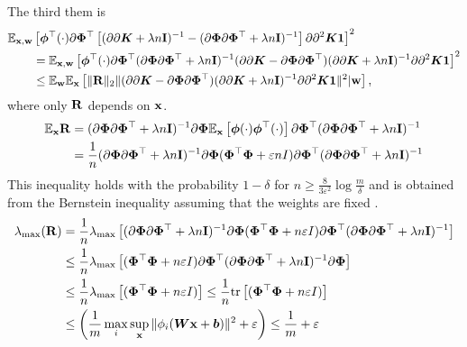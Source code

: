 The third them is
\begin{align*}
    \mathbb{E}_{{\bf x, w}}&\left[{\bm \phi}^{\top}(\cdot)\partial\bm{\Phi}^{\top}\left[(\partial\partial {\bm K} + \lambda n{\bf I})^{-1} - (\partial\bm{\Phi}\partial\bm{\Phi}^{\top} + \lambda n {\bf I})^{-1}\right]\partial\partial^2 {\bm K}{\bf 1}\right]^2 \\
    &= \mathbb{E}_{{\bf x, w}}\left[{\bm \phi}^{\top}(\cdot)\partial\bm{\Phi}^{\top}(\partial\bm{\Phi}\partial\bm{\Phi}^{\top} + \lambda n{\bf I})^{-1}(\partial\partial {\bm K} - \partial\bm{\Phi}\partial\bm{\Phi}^{\top})(\partial\partial {\bm K} + \lambda n {\bf I})^{-1}\partial\partial^2 {\bm K}{\bf 1}\right]^2\\
    &\leq \mathbb{E}_{{\bf w}}\mathbb{E}_{{\bf x}}\left[\|{\bf R}\|_2 \|(\partial\partial {\bm K} - \partial\bm{\Phi}\partial\bm{\Phi}^{\top})(\partial\partial {\bm K} + \lambda n {\bf I})^{-1}\partial\partial^2 {\bm K}{\bf 1}\|^2 | {\bf w}\right],
\end{align*}
where only $\bf R$ depends on ${\bf x}$.
\begin{align*}
    \mathbb{E}_{\bf x}{\bf R}
    &= (\partial\bm{\Phi}\partial\bm{\Phi}^{\top} + \lambda n{\bf I})^{-1}\partial\bm{\Phi}
    \mathbb{E}_{\bf x}\left[{\bm \phi}(\cdot){\bm \phi}^{\top}(\cdot)\right]\partial\bm{\Phi}^{\top}(\partial\bm{\Phi}\partial\bm{\Phi}^{\top} + \lambda n{\bf I})^{-1}\\
    &= \frac{1}{n} (\partial\bm{\Phi}\partial\bm{\Phi}^{\top} + \lambda n{\bf I})^{-1}\partial\bm{\Phi}
    (\bm{\Phi}^{\top}\bm{\Phi} + \varepsilon n I)\partial\bm{\Phi}^{\top}(\partial\bm{\Phi}\partial\bm{\Phi}^{\top} + \lambda n{\bf I})^{-1}
\end{align*}
This inequality holds with the probability $1 - \delta$ for
$n \geq \frac{8}{3\varepsilon^2} \log\frac{m}{\delta}$
and is obtained from the Bernstein inequality assuming that the weights are fixed \cite{Tropp_2015}.
\begin{align*}
    \lambda_{\max}({\bf R})
    &= \frac{1}{n}\lambda_{\max}\left[(\partial\bm{\Phi}\partial\bm{\Phi}^{\top} +
    \lambda n{\bf I})^{-1}\partial\bm{\Phi}
    (\bm{\Phi}^{\top}\bm{\Phi} + n\varepsilon I)\partial\bm{\Phi}^{\top}(\partial\bm{\Phi}
    \partial\bm{\Phi}^{\top} + \lambda n{\bf I})^{-1}\right]\\
    &\leq \frac{1}{n}\lambda_{\max}\left[(\bm{\Phi}^{\top}\bm{\Phi} + n\varepsilon I)
    \partial\bm{\Phi}^{\top}(\partial\bm{\Phi}\partial\bm{\Phi}^{\top} + \lambda n{\bf I})^{-1}\partial\bm{\Phi}
    \right]\\
    &\leq \frac{1}{n}\lambda_{\max}\left[(\bm{\Phi}^{\top}\bm{\Phi} + n\varepsilon I)\right] \leq
    \frac{1}{n}{\rm tr}\left[(\bm{\Phi}^{\top}\bm{\Phi} + n\varepsilon I)\right] \\
    &\leq \left(\frac{1}{m}\max_i\sup_{\bf x}\|\phi_i({\bm W}{\bf x} + {\bm b})\|^2 +
    \varepsilon\right) \leq \frac{1}{m} + \varepsilon
\end{align*}
